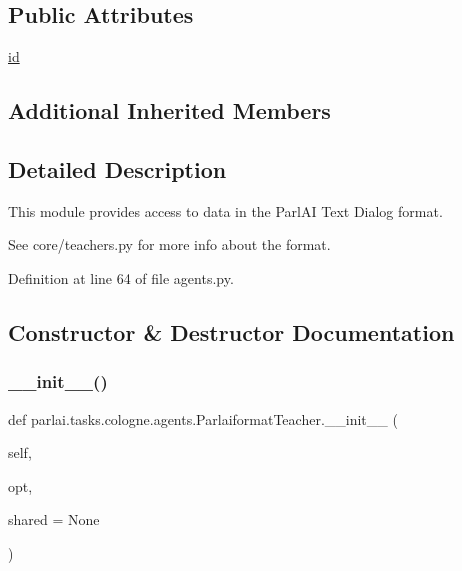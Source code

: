 \subsection*{Public Attributes}
\begin{DoxyCompactItemize}
\item 
\hyperlink{classparlai_1_1tasks_1_1cologne_1_1agents_1_1ParlaiformatTeacher_a3dc8423e1360d4027beb36f3b62287c6}{id}
\end{DoxyCompactItemize}
\subsection*{Additional Inherited Members}


\subsection{Detailed Description}
\begin{DoxyVerb}This module provides access to data in the ParlAI Text Dialog format.

See core/teachers.py for more info about the format.
\end{DoxyVerb}
 

Definition at line 64 of file agents.\+py.



\subsection{Constructor \& Destructor Documentation}
\mbox{\label{classparlai_1_1tasks_1_1cologne_1_1agents_1_1ParlaiformatTeacher_ad9d9559b0ee3eb828922727fa79dcae8}} 
\subsubsection{\texorpdfstring{\+\_\+\+\_\+init\+\_\+\+\_\+()}{\_\_init\_\_()}}
{\footnotesize\ttfamily def parlai.\+tasks.\+cologne.\+agents.\+Parlaiformat\+Teacher.\+\_\+\+\_\+init\+\_\+\+\_\+ (\begin{DoxyParamCaption}\item[{}]{self,  }\item[{}]{opt,  }\item[{}]{shared = {\ttfamily None} }\end{DoxyParamCaption})}




